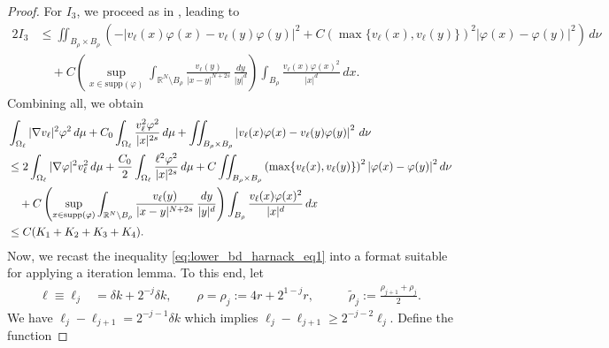 \documentclass[11pt]{article}
\newcommand{\om} {\Omega}
\begin{document}
\begin{proof}
For $I_3$, we proceed as in \cite[Lemma $3.2$]{castro2014nonlocal_harnack}, leading to
\begin{equation*} 
\begin{aligned}
2 I_3 &\leq  \iint_{B_\rho \times B_\rho} \left( - \left| v_{\ell}(x) \varphi(x) - v_{\ell}(y) \varphi(y) \right|^2 + C \left( \max\{ v_{\ell}(x), v_{\ell}(y) \} \right)^2 \left| \varphi(x) - \varphi(y) \right|^2  \right)\, d\nu \\
&\quad + C \left( \sup_{x \in \text{supp}(\varphi)} \int_{\mathbb{R}^N \setminus B_{\rho}} \frac{v_{\ell}(y)}{|x - y|^{N+2s}} \, \frac{dy}{|y|^{d}} \right)\int_{B_{\rho}} \frac{v_{\ell}(x) \varphi(x)^2}{|x|^{d}} \, dx .
\end{aligned}
\end{equation*}
Combining all, we obtain
\begin{align}
  &\int_{\om_{\ell}} |\nabla v_{\ell}|^2 \varphi^2 \, d\mu +  C_0 \int_{\om_{\ell}} \frac{v_{\ell}^2 \varphi^2}{|x|^{2s}} \, d\mu + \iint_{B_\rho \times B_\rho} \left| v_{\ell}(x) \varphi(x) - v_{\ell}(y) \varphi(y) \right|^2\, d\nu \notag\\
  &\leq  2 \int_{\om_{\ell}} |\nabla \varphi|^2 v_{\ell}^2 \, d\mu 
+ \frac{C_0}{2} \int_{\om_{\ell}} \frac{\ell^2 \varphi^2}{|x|^{2s}} \, d\mu +
C \iint_{B_\rho \times B_\rho}  \left( \max\{ v_{\ell}(x), v_{\ell}(y) \} \right)^2 \left| \varphi(x) - \varphi(y) \right|^2  d\nu \notag\\
&\quad + C \left( \sup_{x \in \text{supp}(\varphi)} \int_{\mathbb{R}^N \setminus B_{\rho}} \frac{v_{\ell}(y)}{|x - y|^{N+2s}} \, \frac{dy}{|y|^{d}} \right)\int_{B_{\rho}} \frac{v_{\ell}(x) \varphi(x)^2}{|x|^{d}} \, dx \notag\\
& \leq C(K_1 + K_2 + K_3 + K_4). \label{eq:lower_bd_harnack_eq1}
\end{align}
Now, we recast the inequality \eqref{eq:lower_bd_harnack_eq1} into a format suitable for applying a iteration lemma. To this end, let
\begin{equation*}
\begin{aligned}
\ell \equiv \ell_j &= \delta k + 2^{-j} \delta k, \qquad
\rho = \rho_j :=4r +  2^{1-j}r,& \qquad 
\tilde{\rho}_j := \frac{\rho_{j+1} + \rho_j}{2}.
\end{aligned}
\end{equation*}
We have $\ell_j - \ell_{j+1} = 2^{-j-1} \delta k$ which implies $\ell_j - \ell_{j+1} \geq 2^{-j-2} \ell_j$. Define the function

\end{proof}
\end{document}
